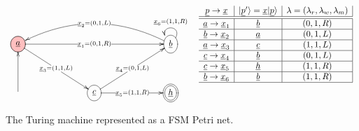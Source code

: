 \begin{figure}[h!]
$$
\begin{array}{cc}
\xymatrix@C=6pc@R=3pc{
\PinkCircle{\rva}
\ar[rr]|{\rvx_1=(0,1,R)}
\ar[rd]|{\rvx_3=(1,1, L)}
&&\Circle{\rvb}\ar@(ru,lu)[]_{\rvx_6=(1,1,R)}
\ar@/_2pc/[ll]|{\rvx_2=(0,1,L)}
\\
\ar[u]
&\Circle{\rvc}
\ar[ru]|{\rvx_4=(0,1, L)}
\ar[r]|{\rvx_5=(1,1, R)}
&\DCircle{\rvh}
}
&
\begin{array}{c|c|c|}
\rvp\rarrow \rvx
&\ket{\rvp'}=\rvx\ket{\rvp}
& \lam=(\lam_r,
\lam_w,
\lam_m)
\\
\hline\hline
\rva\rarrow\rvx_1
&\rvb
&(0,1,R)
\\ \hline
\rvb\rarrow\rvx_2
&\rva
&(0,1,L)
\\ \hline
\rva\rarrow\rvx_3
&\rvc
& (1,1,L)
\\ \hline
\rvc\rarrow\rvx_4
&\rvb
& (0,1,L)
\\\hline
\rvc\rarrow\rvx_5
&\rvh
&(1,1,R)
\\ \hline
\rvb\rarrow\rvx_6
&\rvb
&(1,1,R)
\\ \hline
\end{array}
\end{array}
$$
\caption{The  Turing machine represented as a FSM Petri net.}
\label{fig-3-state-bb}
\end{figure}


